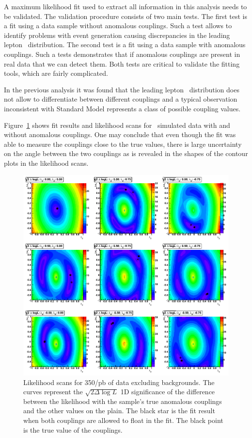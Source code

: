 A maximum likelihood fit used to extract all information in this
analysis needs to be validated. The validation procedure consists of
two main tests. The first test is a fit using a data sample without
anomalous couplings. Such a test allows to identify problems with
event generation causing discrepancies in the leading lepton
\pt\ distribution. The second test is a fit using a data sample with
anomalous couplings. Such a tests demonstrates that if anomalous
couplings are present in real data that we can detect them. Both tests
are critical to validate the fitting tools, which are fairly
complicated.

In the previous analysis it was found that the leading lepton
\pt\ distribution does not allow to differentiate between different
couplings and a typical observation inconsistent with Standard Model
represents a class of possible coupling values.

Figure~\ref{fig:val_scans} shows fit results and likelihood scans for
\ww\ simulated data with and without anomalous couplings. One may
conclude that even though the fit was able to measure the couplings
close to the true values, there is large uncertainty on the angle
between the two couplings as is revealed in the shapes of the contour
plots in the likelihood scans.

\begin{figure}[tp]
  \centerline{
    \includegraphics[width=1.0\textwidth]{figures/validation_likelihood_scans.png}
  }

  \caption[Likelihood scan for Signal Monte Carlo] {Likelihood scans
    for 350/pb of data excluding backgrounds. The curves
    represent the $\sqrt{2\Delta\log L}$ 1D significance of the difference between the
    likelihood with the sample's true anomalous couplings and the other
    values on the plain. The black star is the fit result when both couplings are
    allowed to float in the fit. The black point is the true value of the couplings.}
  \label{fig:val_scans}
\end{figure}

